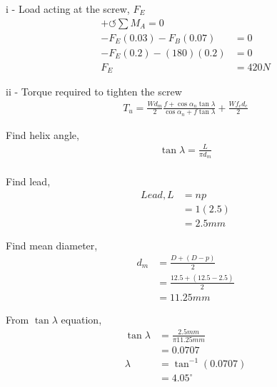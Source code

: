 \documentclass[a4paper, fleqn]{article}
\begin{document}
i - Load acting at the screw, $F_E$
\begin{equation*}
    \begin{aligned}
    +\circlearrowleft \sum M_A =0\\  
    -F_E(0.03)-F_B(0.07) &=0\\ 
    -F_E(0.2)-(180)(0.2) &=0\\ 
    F_E &= 420  N
    \end{aligned}
\end{equation*}

ii - Torque required to tighten the screw
\begin{equation*}
    \begin{aligned}
    T_u = \frac{Wd_m}{2} \frac{f+\cos\alpha_n \tan\lambda}{\cos\alpha_n + f\tan\lambda} + \frac{Wf_c d_c}{2}
    \end{aligned}
\end{equation*}

Find helix angle,
\begin{equation*}
    \begin{aligned}
    \tan\lambda = \frac{L}{\pi d_m}\\
    \end{aligned}
\end{equation*}

Find lead,
\begin{equation*}
    \begin{aligned}
    Lead, L &=np\\
    &=1(2.5)\\
    &=2.5mm    
    \end{aligned}
\end{equation*}

Find mean diameter,
\begin{equation*}
    \begin{aligned}
    d_m &= \frac {D+(D-p)}{2}\\  
    &= \frac {12.5+(12.5-2.5)}{2}\\ 
    &= 11.25mm
    \end{aligned}
\end{equation*}

From $\tan\lambda$ equation,
\begin{equation*}
    \begin{aligned}
    \tan\lambda &= \frac{2.5mm}{\pi 11.25mm} \\
    &=0.0707\\
    \lambda &= \tan^{-1}(0.0707)\\
    &=4.05^{\circ}
    \end{aligned}
\end{equation*}
\end{document}
